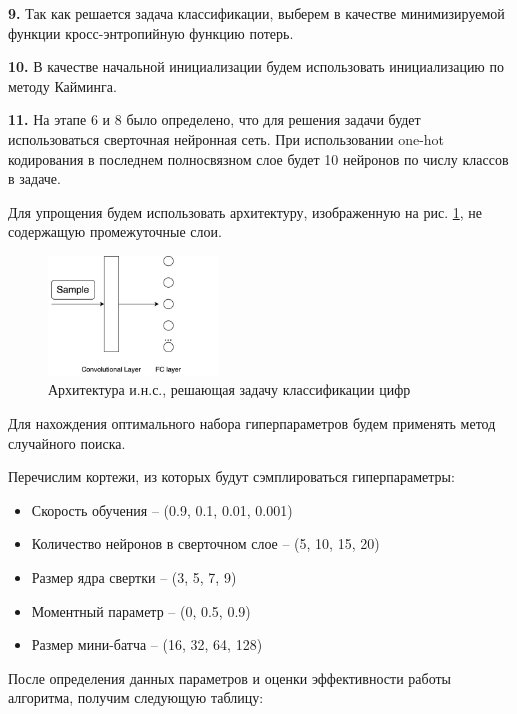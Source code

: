 				\textbf{9.} Так как решается задача классификации, выберем в качестве минимизируемой функции кросс-энтропийную функцию потерь.
				
				\textbf{10.} В качестве начальной инициализации будем использовать инициализацию по методу Кайминга.
				
				\textbf{11.} На этапе 6 и 8 было определено, что для решения задачи будет использоваться сверточная нейронная сеть. При использовании one-hot кодирования в последнем полносвязном слое будет 10 нейронов по числу классов в задаче.
				
				Для упрощения будем использовать архитектуру, изображенную на рис. \ref{fig:model}, не содержащую промежуточные слои.
				
				\begin{figure}[h]
					\centering
					\includegraphics[width=0.4\textwidth]{author/part3/figures/model.png}
					\caption{Архитектура и.н.с., решающая задачу классификации цифр}
					\label{fig:model}
				\end{figure}
				
				Для нахождения оптимального набора гиперпараметров будем применять метод случайного поиска.
				
				Перечислим кортежи, из которых будут сэмплироваться гиперпараметры:
				\begin{itemize}
					\item Скорость обучения -- (0.9, 0.1, 0.01, 0.001)
					\item Количество нейронов в сверточном слое -- (5, 10, 15, 20)
					\item Размер ядра свертки -- (3, 5, 7, 9)
					\item Моментный параметр -- (0, 0.5, 0.9)
					\item Размер мини-батча -- (16, 32, 64, 128)
				\end{itemize}
				
				После определения данных параметров и оценки эффективности работы алгоритма, получим следующую таблицу:
				
